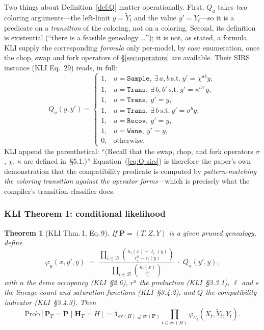 \documentclass[11pt,leqno]{article}
\renewcommand{\Pr}{\mathbf{P}}      %
\newcommand{\Hr}{\mathbf{H}}        %
\newcommand{\Demes}{\mathcal{D}}    %
\newcommand{\indicator}[1]{\mathbf{1}_{#1}}
\newcommand{\brak}[1]{\left[#1\right]}
\newcommand{\code}[1]{\texttt{#1}}
\theoremstyle{plain}
\newtheorem{theorem}{Theorem}
\theoremstyle{definition}
\begin{document}
Two things about Definition~\ref{def:Q} matter operationally.  First,
$Q_u$ takes \emph{two} coloring arguments---the left-limit
$y = \tilde{Y}_t$ and the value $y' = Y_t$---so it is a predicate on a
\emph{transition} of the coloring, not on a coloring.  Second, its
definition is existential (``there is a feasible genealogy \ldots'');
it is not, as stated, a formula.  KLI supply the corresponding
\emph{formula} only per-model, by case enumeration, once the chop,
swap and fork operators of \S\ref{sec:operators} are available.
Their SIRS instance (KLI Eq.~29) reads, in full:
\begin{equation}\label{eq:Q-sirs}
  Q_u(y,y') =
  \begin{cases}
    1, & u = \code{Sample},\ \exists\, a,b \ \text{s.t.}\
        y' = \chi^{ab} y,\\
    1, & u = \code{Trans},\ \exists\, b,b' \ \text{s.t.}\
        y' = \kappa^{bb'} y,\\
    1, & u = \code{Trans},\ y' = y,\\
    1, & u = \code{Trans},\ \exists\, b \ \text{s.t.}\
        y' = \sigma^{b} y,\\
    1, & u = \code{Recov},\ y' = y,\\
    1, & u = \code{Wane},\ y' = y,\\
    0, & \text{otherwise.}
  \end{cases}
\end{equation}
KLI append the parenthetical: ``(Recall that the swap, chop, and fork
operators $\sigma$, $\chi$, $\kappa$ are defined in~\S5.1.)''
Equation~(\ref{eq:Q-sirs}) is therefore the paper's own demonstration
that the compatibility predicate is computed by \emph{pattern-matching
the coloring transition against the operator forms}---which is
precisely what the compiler's transition classifier does.

\subsubsection{KLI Theorem 1: conditional likelihood}

\begin{theorem}[KLI Thm.\,1, Eq.\,9]
If $\Pr = (T, Z, Y)$ is a given pruned genealogy, define
\begin{equation}\label{eq:phi-thm}
  \varphi_u(x, y', y) \;=\;
  \frac{\displaystyle\prod_{i \in \Demes}
    \binom{n_i(x) - \ell_i(y)}{r^u_i - s_i(y)}}
       {\displaystyle\prod_{i \in \Demes}
    \binom{n_i(x)}{r^u_i}}
  \;\cdot\; Q_u(y', y),
\end{equation}
with $n$ the deme occupancy (KLI~\S2.6), $r^u$ the production
(KLI~\S3.3.1), $\ell$ and $s$ the lineage-count and saturation
functions (KLI~\S3.4.2), and $Q$ the compatibility indicator
(KLI~\S3.4.3).  Then
\[
  \mathrm{Prob}\brak{\Pr_T = \Pr \mid \Hr_T = H}
  = \indicator{\mathrm{ev}(H) \supseteq \mathrm{ev}(\Pr)}
  \prod_{t \in \mathrm{ev}(H)} \varphi_{U_t}(X_t, \tilde{Y}_t, Y_t).
\]
\end{theorem}
\end{document}
